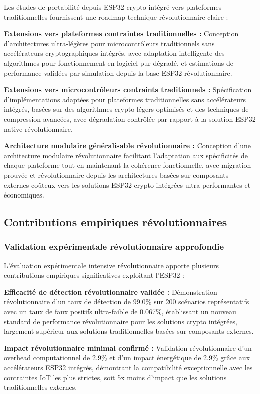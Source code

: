 Les études de portabilité depuis ESP32 crypto intégré vers plateformes traditionnelles fournissent une roadmap technique révolutionnaire claire :

\textbf{Extensions vers plateformes contraintes traditionnelles :} Conception d'architectures ultra-légères pour microcontrôleurs traditionnels sans accélérateurs cryptographiques intégrés, avec adaptation intelligente des algorithmes pour fonctionnement en logiciel pur dégradé, et estimations de performance validées par simulation depuis la base ESP32 révolutionnaire.

\textbf{Extensions vers microcontrôleurs contraints traditionnels :} Spécification d'implémentations adaptées pour plateformes traditionnelles sans accélérateurs intégrés, basées sur des algorithmes crypto légers optimisés et des techniques de compression avancées, avec dégradation contrôlée par rapport à la solution ESP32 native révolutionnaire.

\textbf{Architecture modulaire généralisable révolutionnaire :} Conception d'une architecture modulaire révolutionnaire facilitant l'adaptation aux spécificités de chaque plateforme tout en maintenant la cohérence fonctionnelle, avec migration prouvée et révolutionnaire depuis les architectures basées sur composants externes coûteux vers les solutions ESP32 crypto intégrées ultra-performantes et économiques.

\subsection{Contributions empiriques révolutionnaires}

\subsubsection{Validation expérimentale révolutionnaire approfondie}

L'évaluation expérimentale intensive révolutionnaire apporte plusieurs contributions empiriques significatives exploitant l'ESP32 :

\textbf{Efficacité de détection révolutionnaire validée :} Démonstration révolutionnaire d'un taux de détection de 99.0\% sur 200 scénarios représentatifs avec un taux de faux positifs ultra-faible de 0.067\%, établissant un nouveau standard de performance révolutionnaire pour les solutions crypto intégrées, largement supérieur aux solutions traditionnelles basées sur composants externes.

\textbf{Impact révolutionnaire minimal confirmé :} Validation révolutionnaire d'un overhead computationnel de 2.9\% et d'un impact énergétique de 2.9\% grâce aux accélérateurs ESP32 intégrés, démontrant la compatibilité exceptionnelle avec les contraintes IoT les plus strictes, soit 5x moins d'impact que les solutions traditionnelles externes.

